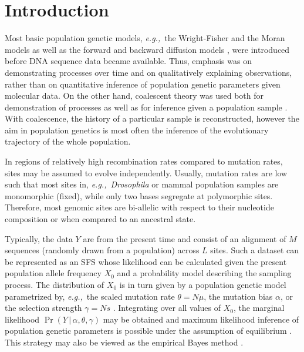 \documentclass[preprint]{elsarticle}
\newcommand\given{{\,|\,}}
\newcommand\eg{{\it e.g.,}}
\begin{document}
\linenumbers

\section{Introduction}

Most basic population genetic models, \eg\ the Wright-Fisher and the Moran models as well as the forward and backward diffusion models \citep[reviewed in][]{Ewen04}, were introduced before DNA sequence data became available. Thus, emphasis was on demonstrating processes over time and on qualitatively explaining observations, rather than on quantitative inference of population genetic parameters given molecular data. On the other hand, coalescent theory \citep{King82} was used both for demonstration of processes as well as for inference given a population sample \citep{Hein05,Wake09}. With coalescence, the history of a particular sample is reconstructed, however the aim in population genetics is most often the inference of the evolutionary trajectory of the whole population.

In regions of relatively high recombination rates compared to mutation rates, sites may be assumed to evolve independently. Usually, mutation rates are low such that most sites in, \eg\ \textit{Drosophila} or mammal population samples are monomorphic (fixed), while only two bases segregate at polymorphic sites. Therefore, most genomic sites are bi-allelic with respect to their nucleotide composition or when compared to an ancestral state. %

Typically, the data $Y$ are from the present time and consist of an alignment of $M$ sequences (randomly drawn from a population) across $L$ sites. Such a dataset can be represented as an SFS whose likelihood can be calculated given the present population allele frequency $X_0$ and a probability model describing the sampling process. The distribution of $X_0$ is in turn given by a population genetic model parametrized by, \eg\ the scaled mutation rate $\theta=N\mu$, the mutation bias $\alpha$, or the selection strength $\gamma=Ns$ \citep[as defined in][]{Vogl15}. Integrating over all values of $X_0$, the marginal likelihood $\Pr(Y\given \alpha,\theta,\gamma)$ may be obtained and maximum likelihood inference of population genetic parameters is possible under the assumption of equilibrium \citep{Vogl14b,Vogl15}. This strategy may also be viewed as the empirical Bayes method \citep[\eg][]{Carl00}. 
\end{document}
